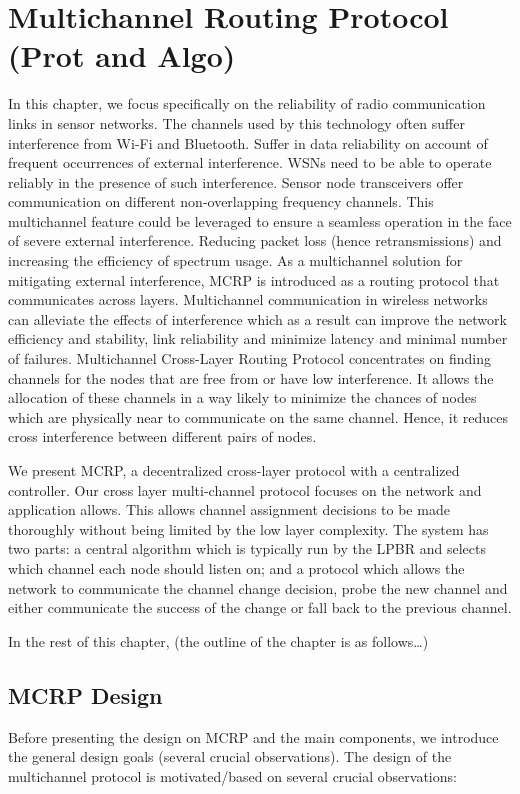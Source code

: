 \chapter{Multichannel Routing Protocol (Prot and Algo)}
\label{MCRP}

In this chapter, we focus specifically on the reliability of radio communication links in sensor networks.
The channels used by this technology often suffer interference from Wi-Fi and Bluetooth. 
Suffer in data reliability on account of frequent occurrences of external interference.
WSNs need to be able to operate reliably in the presence of such interference.
Sensor node transceivers offer communication on different non-overlapping frequency channels. This multichannel feature could be leveraged to ensure a seamless operation in the face of severe external interference. Reducing packet loss (hence retransmissions) and increasing the efficiency of spectrum usage.
As a multichannel solution for mitigating external interference, MCRP is introduced as a routing protocol that communicates across layers. 
Multichannel communication in wireless networks can alleviate the effects of interference which as a result can improve the network efficiency and stability, link reliability and minimize latency and minimal number of failures.
Multichannel Cross-Layer Routing Protocol concentrates on finding channels for the nodes that are free from or have low interference. It allows the allocation of these channels in a way likely to minimize the chances of nodes which are physically near to communicate on the same channel. Hence, it reduces cross interference between different pairs of nodes.

We present MCRP, a decentralized cross-layer protocol with a centralized controller. Our cross layer multi-channel protocol focuses on the network and application allows. This allows channel assignment decisions to be made thoroughly without being limited by the low layer complexity. The system has two parts: a central algorithm which is typically run by the LPBR and selects which channel each node should listen on; and a protocol which allows the network to communicate the channel change decision, probe the new channel and either communicate the success of the change or fall back to the previous channel.

In the rest of this chapter, (the outline of the chapter is as follows…)

\section{MCRP Design}
Before presenting the design on MCRP and the main components, we introduce the general design goals (several crucial observations). The design of the multichannel protocol is motivated/based on several crucial observations: 

